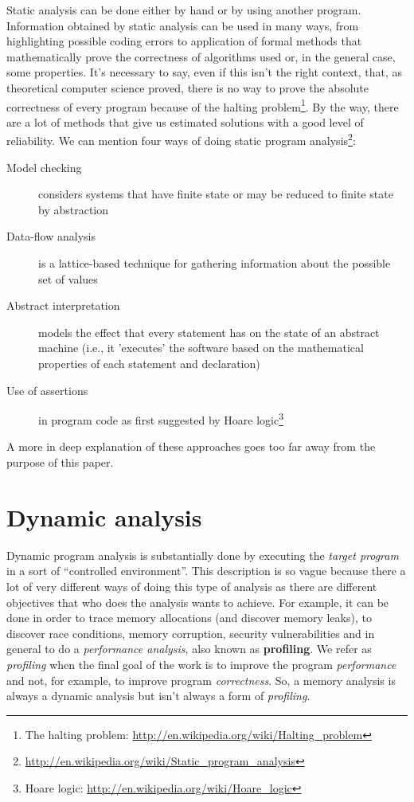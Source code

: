 \documentclass[a4paper,11pt]{report}
\begin{document}
Static analysis can be done either by hand or by using another program. Information obtained by static analysis can be used in many ways, from highlighting possible coding errors to application of formal methods that mathematically prove the correctness of algorithms used or, in the general case, some properties. It's necessary to say, even if this isn't the right context, that, as 
theoretical computer science proved, there is no way to prove the absolute correctness of every program because of the halting problem\footnote{The halting problem: \url{http://en.wikipedia.org/wiki/Halting_problem}}.
By the way, there are a lot of methods that give us estimated solutions with a good level of reliability. We can mention four ways of doing static program
analysis\footnote{\url{http://en.wikipedia.org/wiki/Static_program_analysis}}:


\begin{description}
\item[Model checking] considers systems that have finite state or may be reduced to finite state by abstraction
\item[Data-flow analysis] is a lattice-based technique for gathering information about the possible set of values
\item[Abstract interpretation] models the effect that every statement has on the state of an abstract machine (i.e., it 'executes' the software based on the mathematical properties of each statement and declaration)
\item[Use of assertions] in program code as first suggested by Hoare logic\footnote{Hoare logic: \url{http://en.wikipedia.org/wiki/Hoare_logic}}
\end{description}

A more in deep explanation of these approaches goes too far away from the purpose of this paper.

\section{Dynamic analysis}

Dynamic program analysis is substantially done by executing the \emph{target program} in a sort of ``controlled environment''.
This description is so vague because there a lot of very different ways of doing this type of analysis as there are different objectives that who does the analysis wants to achieve. For example, it can be done in order to trace memory allocations (and discover memory leaks), to discover race conditions, memory corruption, security vulnerabilities and in general to do a \emph{performance analysis}, also known as \textbf{profiling}. We refer as \emph{profiling} when the final goal of the work is to improve the program  \emph{performance} and not, for example, to improve program \emph{correctness}. So, a memory analysis is always a dynamic analysis but isn't always a form of \emph{profiling}.
\end{document}
